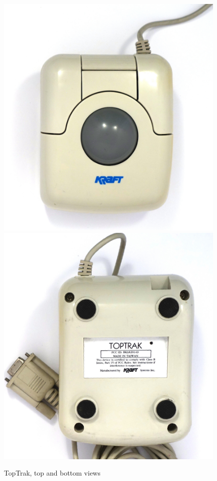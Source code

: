 \documentclass[11pt, a4paper]{article}
\begin{document}
\begin{figure}[h]
    \centering
    \includegraphics[scale=0.4]{1990_kraft_toptrack/2.9_60.jpg}
    \includegraphics[scale=0.4]{1990_kraft_toptrack/2.10_60.jpg}
    \caption{TopTrak, top and bottom views}
    \label{fig:TopTrakTopAndBottom}
\end{figure}
\end{document}
